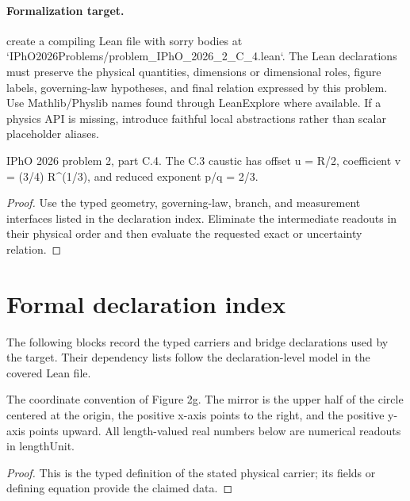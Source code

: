 \paragraph{Formalization target.}
create a compiling Lean file with sorry bodies at `IPhO2026Problems/problem\_IPhO\_2026\_2\_C\_4.lean`. The Lean declarations must preserve the physical quantities, dimensions or dimensional roles, figure labels, governing-law hypotheses, and final relation expressed by this problem.
Use Mathlib/Physlib names found through LeanExplore where available. If a physics API is missing, introduce faithful local abstractions rather than scalar placeholder aliases.

\begin{theorem}
  \label{thm:physics:IPhO_2026_2_C_4:target}
  IPhO 2026 problem 2, part C.4. The C.3 caustic has offset u = R/2, coefficient v = (3/4) R\textasciicircum{}(1/3), and reduced exponent p/q = 2/3.
\end{theorem}
\begin{proof}
  Use the typed geometry, governing-law, branch, and measurement interfaces listed in the declaration index.  Eliminate the intermediate readouts in their physical order and then evaluate the requested exact or uncertainty relation.
\end{proof}
\section*{Formal declaration index}
The following blocks record the typed carriers and bridge declarations used by the target.  Their dependency lists follow the declaration-level model in the covered Lean file.

\begin{definition}
  \label{def:physics:IPhO_2026_2_C_4:aux001}
  The coordinate convention of Figure 2g. The mirror is the upper half of the circle centered at the origin, the positive x-axis points to the right, and the positive y-axis points upward. All length-valued real numbers below are numerical readouts in lengthUnit.
\end{definition}
\begin{proof}
  This is the typed definition of the stated physical carrier; its fields or defining equation provide the claimed data.
\end{proof}

